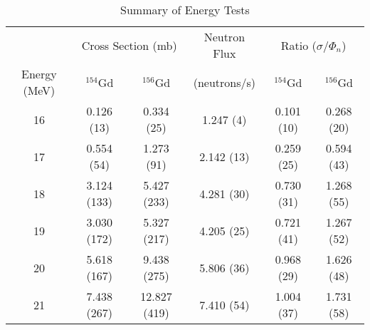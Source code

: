 \begin{table}[]
    \centering
    \caption{Summary of Energy Tests}
    \label{tab:neutrons}
    \begin{tabular}{c|c|c|c|c|c}
        \toprule
        & \multicolumn{2}{c|}{Cross Section (mb)} & Neutron Flux & \multicolumn{2}{c}{Ratio ($\sigma/\Phi_n$)} \\
        Energy (MeV) & $^{154}$Gd & $^{156}$Gd & (neutrons/s) & $^{154}$Gd & $^{156}$Gd \\
        \hline
        16 & 0.126 (13) & 0.334 (25) & 1.247 (4) & 0.101 (10) & 0.268 (20)\\
        17 & 0.554 (54) & 1.273 (91) & 2.142 (13) & 0.259 (25) & 0.594 (43)\\
        18 & 3.124 (133) & 5.427 (233) & 4.281 (30) & 0.730 (31) & 1.268 (55)\\
        19 & 3.030 (172) & 5.327 (217) & 4.205 (25) & 0.721 (41) & 1.267 (52)\\
        20 & 5.618 (167) & 9.438 (275) & 5.806 (36) & 0.968 (29) & 1.626 (48)\\
        21 & 7.438 (267) & 12.827 (419) & 7.410 (54) & 1.004 (37) & 1.731 (58)\\ 
        \bottomrule
    \end{tabular}
\end{table}